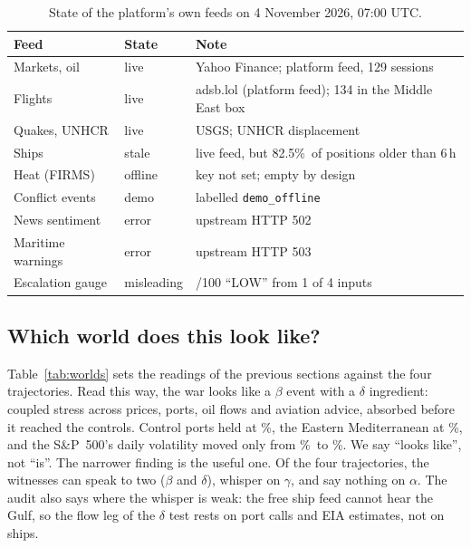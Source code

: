 \documentclass[10pt,twocolumn,letterpaper]{article}
\newcommand{\pct}{\%}
\begin{document}
\begin{table}[t]
\centering\small
\caption{State of the platform's own feeds on 4 November 2026, 07:00 UTC.}\label{tab:audit}
\begin{tabular}{@{}>{\raggedright\arraybackslash}p{2.05cm}>{\raggedright\arraybackslash}p{1.3cm}>{\raggedright\arraybackslash}p{4.1cm}@{}}
\toprule
Feed & State & Note\\\midrule
Markets, oil & live & Yahoo Finance; platform feed, 129 sessions\\
Flights & live & adsb.lol (platform feed); 134 in the Middle East box\\
Quakes, UNHCR & live & USGS; UNHCR displacement\\
Ships & stale & live feed, but 82.5\pct\ of positions older than 6\,h\\
Heat (FIRMS) & offline & key not set; empty by design\\
Conflict events & demo & labelled \texttt{demo\_offline}\\
News sentiment & error & upstream HTTP 502\\
Maritime warnings & error & upstream HTTP 503\\
Escalation gauge & misleading & 2/100 ``LOW'' from 1 of 4 inputs\\\bottomrule
\end{tabular}
\end{table}

\subsection{Which world does this look like?}
Table~\ref{tab:worlds} sets the readings of the previous sections against the four trajectories. Read this way, the war looks like a $\beta$ event with a $\delta$ ingredient: coupled stress across prices, ports, oil flows and aviation advice, absorbed before it reached the controls. Control ports held at \CtrlRatio\pct, the Eastern Mediterranean at \MedRatio\pct, and the S\&P~500's daily volatility moved only from \SPPre\pct\ to \SPPost\pct. We say ``looks like'', not ``is''. The narrower finding is the useful one. Of the four trajectories, the witnesses can speak to two ($\beta$ and $\delta$), whisper on $\gamma$, and say nothing on $\alpha$. The audit also says where the whisper is weak: the free ship feed cannot hear the Gulf, so the flow leg of the $\delta$ test rests on port calls and EIA estimates, not on ships.
\end{document}
